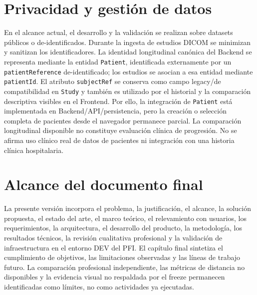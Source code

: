 \section{Privacidad y gestión de datos}

En el alcance actual, el desarrollo y la validación se realizan sobre datasets públicos o de-identificados. Durante la ingesta de estudios DICOM se minimizan y sanitizan los identificadores. La identidad longitudinal canónica del Backend se representa mediante la entidad \texttt{Patient}, identificada externamente por un \texttt{patientReference} de-identificado; los estudios se asocian a esa entidad mediante \texttt{patientId}. El atributo \texttt{subjectRef} se conserva como campo legacy/de compatibilidad en \texttt{Study} y también es utilizado por el historial y la comparación descriptiva visibles en el Frontend. Por ello, la integración de \texttt{Patient} está implementada en Backend/API/persistencia, pero la creación o selección completa de pacientes desde el navegador permanece parcial. La comparación longitudinal disponible no constituye evaluación clínica de progresión. No se afirma uso clínico real de datos de pacientes ni integración con una historia clínica hospitalaria.

\section{Alcance del documento final}

La presente versión incorpora el problema, la justificación, el alcance, la solución propuesta, el estado del arte, el marco teórico, el relevamiento con usuarios, los requerimientos, la arquitectura, el desarrollo del producto, la metodología, los resultados técnicos, la revisión cualitativa profesional y la validación de infraestructura en el entorno DEV del PFI. El capítulo final sintetiza el cumplimiento de objetivos, las limitaciones observadas y las líneas de trabajo futuro. La comparación profesional independiente, las métricas de distancia no disponibles y la evidencia visual no respaldada por el freeze permanecen identificadas como límites, no como actividades ya ejecutadas.
